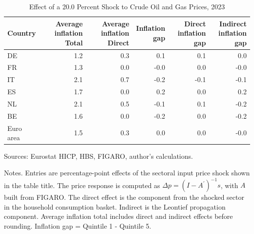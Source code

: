 \documentclass[11pt]{article}
\begin{document}
\begin{table}[H]
\centering
\caption{Effect of a 20.0 Percent Shock to Crude Oil and Gas Prices, 2023}
\scriptsize
\setlength{\tabcolsep}{4.2pt}
\begin{tabular}{lrrrrr}
\toprule
Country & \shortstack{Average inflation\\Total} & \shortstack{Average inflation\\Direct} & \shortstack{Inflation\\gap} & \shortstack{Direct\\inflation gap} & \shortstack{Indirect\\inflation gap}
 \\
\midrule
DE & 1.2 & 0.3 & 0.1 & 0.1 & 0.0
 \\
FR & 1.3 & 0.0 & -0.0 & 0.0 & -0.0
 \\
IT & 2.1 & 0.7 & -0.2 & -0.1 & -0.1
 \\
ES & 1.7 & 0.0 & 0.2 & 0.0 & 0.2
 \\
NL & 2.1 & 0.5 & -0.1 & 0.1 & -0.2
 \\
BE & 1.6 & 0.0 & -0.2 & 0.0 & -0.2
 \\
Euro area & 1.5 & 0.3 & 0.0 & 0.0 & -0.0
 \\
\bottomrule
\end{tabular}
\par\vspace{0.35em}\footnotesize\noindent Sources: Eurostat HICP, HBS, FIGARO, author's calculations.
\par\vspace{0.25em}\footnotesize\noindent Notes. Entries are percentage-point effects of the sectoral input price shock shown in the table title. The price response is computed as $\Delta p = (I - A^{\prime})^{-1}s$, with $A$ built from FIGARO. The direct effect is the component from the shocked sector in the household consumption basket. Indirect is the Leontief propagation component. Average inflation total includes direct and indirect effects before rounding. Inflation gap = Quintile 1 - Quintile 5.
\end{table}
\vspace{0.6em}
\end{document}
